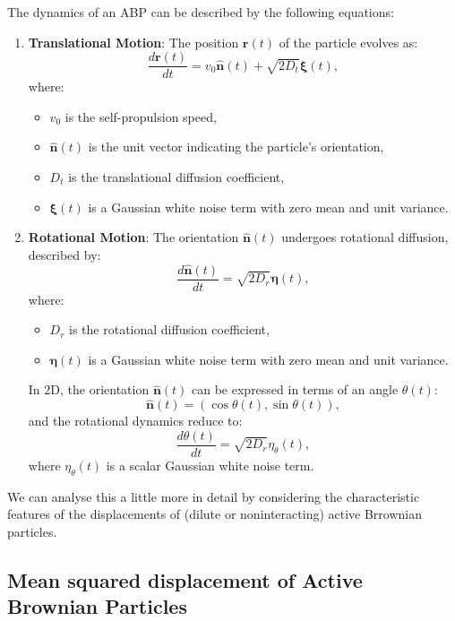\documentclass[
  letterpaper,
  enabledeprecatedfontcommands]{report}
\providecommand{\tightlist}{%
  \setlength{\itemsep}{0pt}\setlength{\parskip}{0pt}}
\begin{document}
The dynamics of an ABP can be described by the following equations:

\begin{enumerate}
\def\labelenumi{\arabic{enumi}.}
\tightlist
\item
  \textbf{Translational Motion}: The position \(\mathbf{r}(t)\) of the
  particle evolves as: \[
   \frac{d\mathbf{r}(t)}{dt} = v_0 \hat{\mathbf{n}}(t) + \sqrt{2D_t} \boldsymbol{\xi}(t),
   \] where:

  \begin{itemize}
  \tightlist
  \item
    \(v_0\) is the self-propulsion speed,
  \item
    \(\hat{\mathbf{n}}(t)\) is the unit vector indicating the particle's
    orientation,
  \item
    \(D_t\) is the translational diffusion coefficient,
  \item
    \(\boldsymbol{\xi}(t)\) is a Gaussian white noise term with zero
    mean and unit variance.
  \end{itemize}
\item
  \textbf{Rotational Motion}: The orientation \(\hat{\mathbf{n}}(t)\)
  undergoes rotational diffusion, described by: \[
   \frac{d\hat{\mathbf{n}}(t)}{dt} = \sqrt{2D_r} \boldsymbol{\eta}(t),
   \] where:

  \begin{itemize}
  \tightlist
  \item
    \(D_r\) is the rotational diffusion coefficient,
  \item
    \(\boldsymbol{\eta}(t)\) is a Gaussian white noise term with zero
    mean and unit variance.
  \end{itemize}

  In 2D, the orientation \(\hat{\mathbf{n}}(t)\) can be expressed in
  terms of an angle \(\theta(t)\): \[
   \hat{\mathbf{n}}(t) = (\cos\theta(t), \sin\theta(t)),
   \] and the rotational dynamics reduce to: \[
   \frac{d\theta(t)}{dt} = \sqrt{2D_r} \eta_\theta(t),
   \] where \(\eta_\theta(t)\) is a scalar Gaussian white noise term.
\end{enumerate}

We can analyse this a little more in detail by considering the
characteristic features of the displacements of (dilute or
noninteracting) active Brrownian particles.

\subsection{Mean squared displacement of Active Brownian
Particles}\label{mean-squared-displacement-of-active-brownian-particles}
\end{document}
